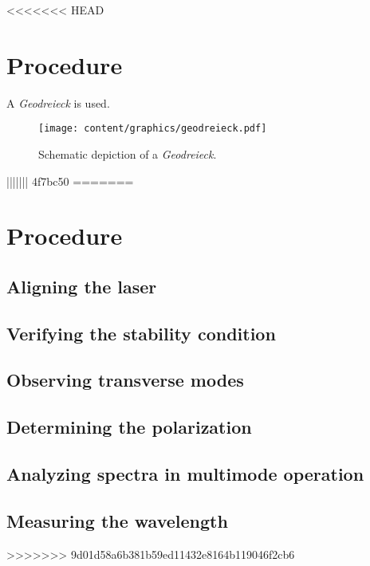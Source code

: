 <<<<<<< HEAD
\section{Procedure}
\label{sec:procedure}

A \emph{Geodreieck} is used.

\begin{figure}
	\label{fig:geodreieck}
	\centering
	\texttt{[image: content/graphics/geodreieck.pdf]}
	\caption{Schematic depiction of a \emph{Geodreieck}.}
\end{figure}
||||||| 4f7bc50
=======
\section{Procedure}

\subsection{Aligning the laser}

\subsection{Verifying the stability condition}

\subsection{Observing transverse modes}

\subsection{Determining the polarization}

\subsection{Analyzing spectra in multimode operation}

\subsection{Measuring the wavelength}
>>>>>>> 9d01d58a6b381b59ed11432e8164b119046f2cb6
